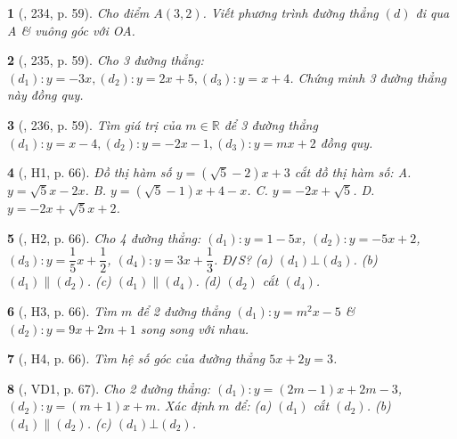 \documentclass{article}
\newtheorem{baitoan}{}
\begin{document}
\begin{baitoan}[\cite{Tuyen_Toan_8}, 234, p. 59]
	Cho điểm $A(3,2)$. Viết phương trình đường thẳng $(d)$ đi qua A \& vuông góc với OA.
\end{baitoan}

\begin{baitoan}[\cite{Tuyen_Toan_8}, 235, p. 59]
	Cho 3 đường thẳng: $(d_1):y = -3x,(d_2):y = 2x + 5,(d_3):y = x + 4$. Chứng minh 3 đường thẳng này đồng quy.
\end{baitoan}

\begin{baitoan}[\cite{Tuyen_Toan_8}, 236, p. 59]
	Tìm giá trị của $m\in\mathbb{R}$ để 3 đường thẳng $(d_1):y = x - 4,(d_2):y = -2x - 1,(d_3):y = mx + 2$ đồng quy.
\end{baitoan}

\begin{baitoan}[\cite{Binh_boi_duong_Toan_9_tap_1}, H1, p. 66]
	Đồ thị hàm số $y = (\sqrt{5} - 2)x + 3$ cắt đồ thị hàm số: {\sf A.} $y =  \sqrt{5}x - 2x$. {\sf B.} $y = (\sqrt{5} - 1)x + 4 - x$. {\sf C.} $y = -2x + \sqrt{5}$. {\sf D.} $y = -2x + \sqrt{5}x + 2$.
\end{baitoan}

\begin{baitoan}[\cite{Binh_boi_duong_Toan_9_tap_1}, H2, p. 66]
	Cho 4 đường thẳng: $ (d_1):y = 1 - 5x$, $ (d_2):y = -5x + 2$, $(d_3): y = \dfrac{1}{5}x + \dfrac{1}{2}$, $(d_4):y = 3x + \dfrac{1}{3}$. {\rm Đ{\tt/}S?} (a) $(d_1)\bot(d_3)$. (b) $(d_1)\parallel(d_2)$. (c) $(d_1)\parallel(d_4)$. (d) $(d_2)$ cắt $(d_4)$.
\end{baitoan}

\begin{baitoan}[\cite{Binh_boi_duong_Toan_9_tap_1}, H3, p. 66]
	Tìm $m$ để 2 đường thẳng $(d_1):y = m^2x - 5$ \& $(d_2):y = 9x + 2m + 1$ song song với nhau.
\end{baitoan}

\begin{baitoan}[\cite{Binh_boi_duong_Toan_9_tap_1}, H4, p. 66]
	Tìm hệ số góc của đường thẳng $5x + 2y = 3$.
\end{baitoan}

\begin{baitoan}[\cite{Binh_boi_duong_Toan_9_tap_1}, VD1, p. 67]
	Cho 2 đường thẳng: $(d_1):y = (2m - 1)x + 2m - 3$, $(d_2):y = (m + 1)x + m$. Xác định $m$ để: (a) $(d_1)$ cắt $(d_2)$. (b) $(d_1)\parallel(d_2)$. (c) $(d_1)\bot(d_2)$.
\end{baitoan}
\end{document}
